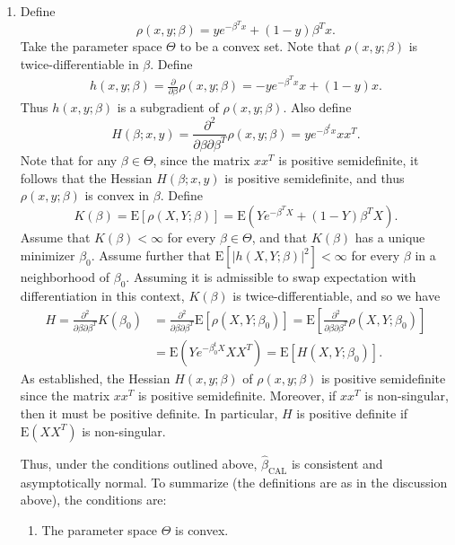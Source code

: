\documentclass[12pt]{article}
\newcommand{\E}{\mathrm{E}}
\begin{document}
\begin{enumerate}
\begin{enumerate}[label=(\roman*)]
\item
Define
\begin{equation*}
\rho(x, y; \beta) = ye^{-\beta^T x} + (1-y)\beta^T x.
\end{equation*}
Take the parameter space $\Theta$ to be a convex set. Note that $\rho(x, y; \beta)$ is twice-differentiable in $\beta$. Define
\begin{align*}
h(x, y; \beta) = \frac{\partial}{\partial \beta} \rho(x, y; \beta) = -ye^{-\beta^T x} x + (1-y)x.
\end{align*}
Thus $h(x, y; \beta)$ is a subgradient of $\rho(x, y; \beta)$. Also define
\begin{equation*}
H(\beta; x, y) = \frac{\partial^2}{\partial \beta \partial \beta^T} \rho(x, y; \beta) = ye^{-\beta^t x} xx^T.
\end{equation*}
Note that for any $\beta \in \Theta$, since the matrix $xx^T$ is positive semidefinite, it follows that the Hessian $H(\beta; x, y)$ is positive semidefinite, and thus $\rho(x, y; \beta)$ is convex in $\beta$. Define
\begin{equation*}
K(\beta) = \E[\rho(X, Y; \beta)] = \E(Ye^{-\beta^T X} + (1-Y)\beta^T X).
\end{equation*}
Assume that $K(\beta) < \infty$ for every $\beta \in \Theta$, and that $K(\beta)$ has a unique minimizer $\beta_0$. Assume further that $\E[|h(X, Y; \beta)|^2] < \infty$ for every $\beta$ in a neighborhood of $\beta_0$. Assuming it is admissible to swap expectation with differentiation in this context, $K(\beta)$ is twice-differentiable, and so we have
\begin{align*}
H = \frac{\partial^2}{\partial \beta \partial \beta^T} K(\beta_0) &= \frac{\partial^2}{\partial \beta \partial \beta^T} \E[\rho(X, Y; \beta_0)] = \E\left[\frac{\partial^2}{\partial \beta \partial \beta^T} \rho(X, Y; \beta_0)\right] \\
&= \E(Ye^{-\beta_0^t X} XX^T) = \E[H(X, Y; \beta_0)].
\end{align*}
As established, the Hessian $H(x, y; \beta)$ of $\rho(x, y; \beta)$ is positive semidefinite since the matrix $xx^T$ is positive semidefinite. Moreover, if $xx^T$ is non-singular, then it must be positive definite. In particular, $H$ is positive definite if $\E(XX^T)$ is non-singular.

Thus, under the conditions outlined above, $\hat{\beta}_\mathrm{CAL}$ is consistent and asymptotically normal. To summarize (the definitions are as in the discussion above), the conditions are:
\begin{enumerate}[label=(\arabic*)]
\item
The parameter space $\Theta$ is convex.


\end{enumerate}
\end{enumerate}
\end{enumerate}
\end{document}
